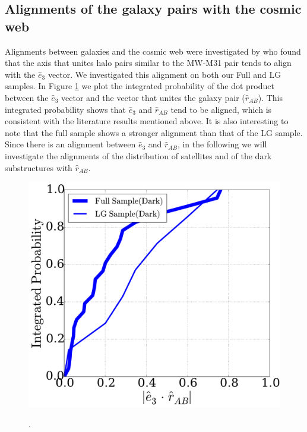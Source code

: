\documentclass{emulateapj}
\begin{document}
\subsection{Alignments of the galaxy pairs with the cosmic web}
\label{AlignmentsGalCosmicWeb}
Alignments between galaxies and the cosmic web were investigated by \citep{ForeroRomero2013} who found that the axis that unites halo pairs similar to the MW-M31 pair tends to align with the $\hat e_3$ vector. 
We investigated this alignment on both our Full and LG samples. 
In Figure \ref{fig:alignment_e3_cosmicweb} we plot the integrated probability of the dot product between the $\hat e_3$ vector and the vector that unites the galaxy pair ($\hat r_{AB}$). 
This integrated probability shows that $\hat e_3$ and $\hat r_{AB}$ tend to be aligned, which is consistent with the literature results mentioned above. 
It is also interesting to note that the full sample shows a stronger alignment than that of the LG sample. Since there is an alignment between $\hat e_3$ and $\hat r_{AB}$, in the following we will investigate the alignments of the distribution of satellites and of the dark substructures with $\hat r_{AB}$.\\
\begin{figure}
\centering
\includegraphics[width=\hsize]{r_tweb_e3_alignment.pdf}\\
\caption{.}
\label{fig:alignment_e3_cosmicweb}
\end{figure}
\end{document}
